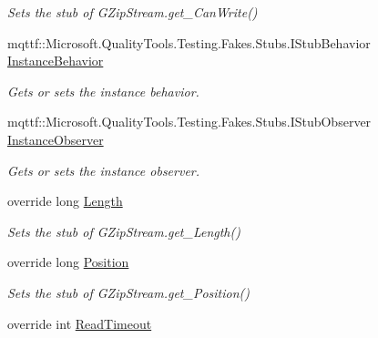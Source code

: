 \begin{DoxyCompactItemize}
\begin{DoxyCompactList}\small\item\em Sets the stub of G\-Zip\-Stream.\-get\-\_\-\-Can\-Write()\end{DoxyCompactList}\item 
mqttf\-::\-Microsoft.\-Quality\-Tools.\-Testing.\-Fakes.\-Stubs.\-I\-Stub\-Behavior \hyperlink{class_system_1_1_i_o_1_1_compression_1_1_fakes_1_1_stub_g_zip_stream_a22f57c429110516c04b6f26b237e51c1}{Instance\-Behavior}
\begin{DoxyCompactList}\small\item\em Gets or sets the instance behavior.\end{DoxyCompactList}\item 
mqttf\-::\-Microsoft.\-Quality\-Tools.\-Testing.\-Fakes.\-Stubs.\-I\-Stub\-Observer \hyperlink{class_system_1_1_i_o_1_1_compression_1_1_fakes_1_1_stub_g_zip_stream_a8e10be7537fcdfbedde9858d72b40165}{Instance\-Observer}
\begin{DoxyCompactList}\small\item\em Gets or sets the instance observer.\end{DoxyCompactList}\item 
override long \hyperlink{class_system_1_1_i_o_1_1_compression_1_1_fakes_1_1_stub_g_zip_stream_a548f9ad317bfab6960b1e80705500b64}{Length}
\begin{DoxyCompactList}\small\item\em Sets the stub of G\-Zip\-Stream.\-get\-\_\-\-Length()\end{DoxyCompactList}\item 
override long \hyperlink{class_system_1_1_i_o_1_1_compression_1_1_fakes_1_1_stub_g_zip_stream_a70a4ee67aad1c5100c2d5eaae48b7fd7}{Position}
\begin{DoxyCompactList}\small\item\em Sets the stub of G\-Zip\-Stream.\-get\-\_\-\-Position()\end{DoxyCompactList}\item 
override int \hyperlink{class_system_1_1_i_o_1_1_compression_1_1_fakes_1_1_stub_g_zip_stream_a7cbe804d3036e2f0b6b1d99434de51bc}{Read\-Timeout}

\end{DoxyCompactItemize}
